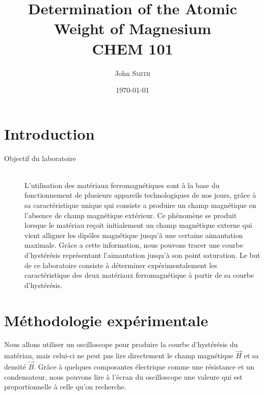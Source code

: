 \documentclass{article}
\title{Determination of the Atomic \\ Weight of Magnesium \\ CHEM 101} %
\author{John \textsc{Smith}} %
\date{\today} %
\begin{document}

\section{Introduction}

\begin{description}
\item[Objectif du laboratoire] \hfill \\

L'utilisation des matériaux ferromagnétiques sont à la base du fonctionnement de plusieurs
appareils technologiques de nos jours, grâce à sa caractéristique unique qui consiste a produire un champ magnétique en l'absence de champ magnétique extérieur. Ce phénomène se produit lorsque le matériau reçoit initialement un champ magnétique externe qui vient alligner les dipôles magnétique jusqu'à une certaine aimantation maximale. Grâce 
a cette information, nous pouvons tracer une courbe d'hystérésis représentant l'aimantation jusqu'à son point saturation. Le but de ce laboratoire consiste à déterminer expérimentalement les caractéristique des deux matériaux ferromagnétique à partir de sa courbe d'hystérésis.
\end{description}
 

\section{Méthodologie expérimentale}
Nous allons utiliser un oscilloscope pour produire la courbe d'hystérésis du matériau, mais celui-ci ne peut pas lire directement le champ magnétique $\vec{H}$ et sa densité $\vec{B}$. Grâce à quelques composantes électrique comme une résistance et un condensateur, nous pouvons lire à l'écran du oscilloscope une valeure qui est proportionnelle à celle qu'on recherche.
\end{document}
